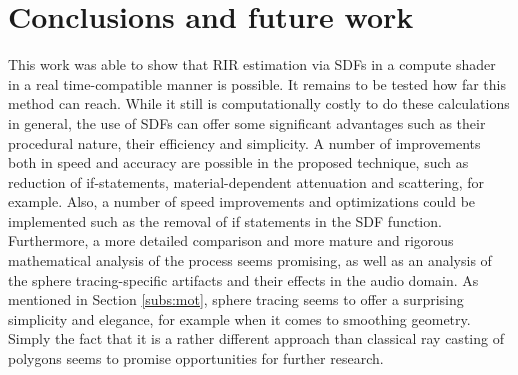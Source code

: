 \documentclass[twoside,a4paper]{article}
\begin{document}
\section{Conclusions and future work}
\label{sec:concl}

This work was able to show that RIR estimation via SDFs in a compute shader in a real time-compatible manner is possible. It remains to be tested how far this method can reach. While it still is computationally costly to do these calculations in general, the use of SDFs can offer some significant advantages such as their procedural nature, their efficiency and simplicity. A number of improvements both in speed and accuracy are possible in the proposed technique, such as reduction of if-statements, material-dependent attenuation and scattering, for example. Also, a number of speed improvements and optimizations could be implemented such as the removal of if statements in the SDF function. Furthermore, a more detailed comparison and more mature and rigorous mathematical analysis of the process seems promising, as well as an analysis of the sphere tracing-specific artifacts and their effects in the audio domain. As mentioned in Section \ref{subs:mot}, sphere tracing seems to offer a surprising simplicity and elegance, for example when it comes to smoothing geometry. Simply the fact that it is a rather different approach than classical ray casting of polygons seems to promise opportunities for further research. 
\end{document}
